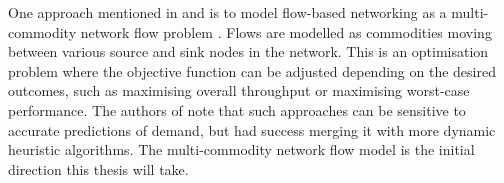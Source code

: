 One approach mentioned in \cite{wellons:augmenting} and \cite{dai:dynamic} is to model flow-based networking as a multi-commodity network flow problem \cite[pp. 862--863]{cormen:algorithms}. Flows are modelled as commodities moving between various source and sink nodes in the network. This is an optimisation problem where the objective function can be adjusted depending on the desired outcomes, such as maximising overall throughput or maximising worst-case performance. The authors of \cite{wellons:augmenting} note that such approaches can be sensitive to accurate predictions of demand, but had success merging it with more dynamic heuristic algorithms. The multi-commodity network flow model is the initial direction this thesis will take.
